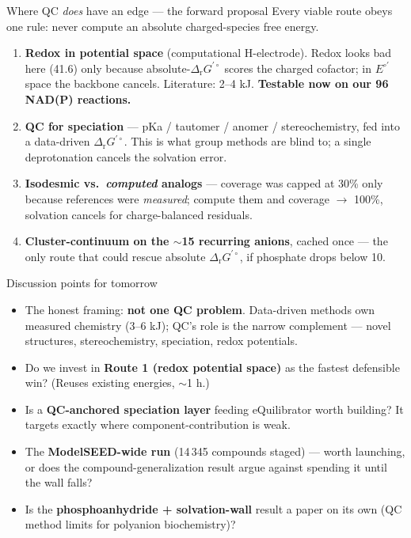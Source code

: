 \documentclass[aspectratio=169,11pt]{beamer}
\newcommand{\dG}{\Delta_{\mathrm r}G^{\prime\circ}}
\newcommand{\good}[1]{\textcolor{good}{#1}}
\begin{document}
\begin{frame}{Where QC \emph{does} have an edge --- the forward proposal}
  Every viable route obeys one rule: \alert{never compute an absolute
  charged-species free energy.}
  \vspace{0.8em}
  \begin{enumerate}
    \item \good{\textbf{Redox in potential space}} (computational H-electrode).
      Redox looks bad here (41.6) only because absolute-$\dG$ scores the charged
      cofactor; in $E^{\circ\prime}$ space the backbone cancels. Literature:
      2--4 kJ. \textbf{Testable now on our 96 NAD(P) reactions.}
    \item \good{\textbf{QC for speciation}} --- pKa / tautomer / anomer /
      stereochemistry, fed into a data-driven $\dG$. This is what group methods
      are blind to; a single deprotonation cancels the solvation error.
    \item \textbf{Isodesmic vs.\ \emph{computed} analogs} --- coverage was
      capped at 30\% only because references were \emph{measured}; compute them
      and coverage $\to$ 100\%, solvation cancels for charge-balanced residuals.
    \item \textbf{Cluster-continuum on the $\sim$15 recurring anions}, cached
      once --- the only route that could rescue absolute $\dG$, if phosphate
      drops below 10.
  \end{enumerate}
\end{frame}

\begin{frame}{Discussion points for tomorrow}
  \begin{itemize}
    \item The honest framing: \textbf{not one QC problem}. Data-driven methods
      own measured chemistry (3--6 kJ); QC's role is the narrow complement ---
      novel structures, stereochemistry, speciation, redox potentials.
    \item Do we invest in \textbf{Route 1 (redox potential space)} as the
      fastest defensible win? (Reuses existing energies, $\sim$1 h.)
    \item Is a \textbf{QC-anchored speciation layer} feeding eQuilibrator worth
      building? It targets exactly where component-contribution is weak.
    \item The \textbf{ModelSEED-wide run} (14\,345 compounds staged) --- worth
      launching, or does the compound-generalization result argue against
      spending it until the wall falls?
    \item Is the \textbf{phosphoanhydride + solvation-wall} result a paper on
      its own (QC method limits for polyanion biochemistry)?
  \end{itemize}
\end{frame}
\end{document}
